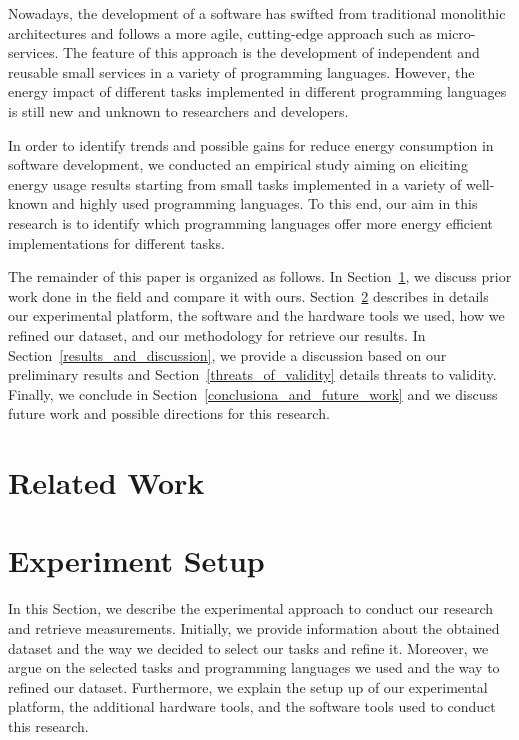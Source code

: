 Nowadays, the development of a software has swifted from traditional 
monolithic architectures and follows a more agile, cutting-edge 
approach such as micro-services. 
The feature of this approach is the development of independent and 
reusable small services in a variety of programming languages.
However, the energy impact of different tasks implemented in different 
programming languages is still new and unknown to researchers and
developers.


In order to identify trends and possible gains for reduce energy 
consumption in software development, we conducted an empirical 
study aiming on eliciting energy usage results starting from small 
tasks implemented in a variety of well-known and highly used 
programming languages. 
To this end, our aim in this research is to identify which 
programming languages offer more energy efficient implementations 
for different tasks.


The remainder of this paper is organized as follows.
In Section~\ref{related_work}, we discuss prior work done in the 
field and compare it with ours. 
Section~\ref{experiment_setup} describes in details our experimental 
platform, the software and the hardware tools we used, how we 
refined our dataset, and our methodology for retrieve our results. 
In Section~\ref{results_and_discussion}, we provide a discussion 
based on our preliminary results and Section~\ref{threats_of_validity} 
details threats to validity.
Finally, we conclude in Section~\ref{conclusiona_and_future_work} 
and we discuss future work and possible directions for this 
research.


\section{Related Work} \label{related_work}

\section{Experiment Setup} \label{experiment_setup}
In this Section, we describe the experimental approach to conduct 
our research and retrieve measurements. 
Initially, we provide information about the obtained dataset 
and the way we decided to select our tasks and refine it. 
Moreover, we argue on the selected tasks and programming 
languages we used and the way to refined our dataset.
Furthermore, we explain the setup up of our experimental 
platform, the additional hardware tools, and the software 
tools used to conduct this research. 

